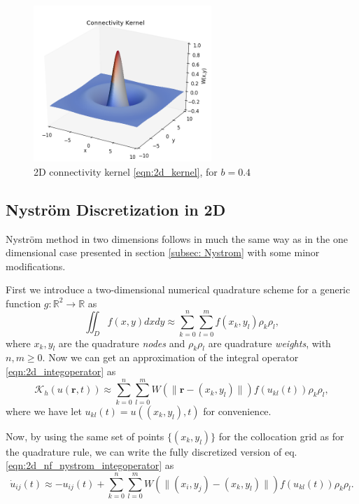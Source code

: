 \documentclass{uonmathreport}
\begin{document}
\begin{figure}
	\begin{center}
		\includegraphics[width=0.6\textwidth]{Figures/2d_kernel.png}
	\end{center}
	\caption{2D connectivity kernel \ref{eqn:2d_kernel}, for $b = 0.4$}
	\label{fig:2d_kernel}
\end{figure}

\subsection{Nystr\"om Discretization in 2D}\label{subsec:2d_nystrom}
Nystr\"om method in two dimensions follows in much the same way as in the one dimensional case presented in section \ref{subsec: Nystrom} with some minor modifications.

First we introduce a two-dimensional numerical quadrature scheme for a generic function $g: \mathbb{R}^2 \rightarrow \mathbb{R}$ as
\begin{equation}
	\iint_D f(x,y) dxdy \approx \sum_{k=0}^{n} \sum_{l=0}^{m} f(x_k, y_l)\rho_k\rho_l,
\end{equation}
where $x_k , y_l$ are the quadrature \textit{nodes} and $\rho_k\rho_l$ are quadrature \textit{weights}, with $n,m \geq 0$. Now we can get an approximation of the integral operator \ref{eqn:2d_integoperator} as
\begin{equation}
	\mathcal{K}_h(u(\mathbf{r},t)) \approx \sum_{k=0}^{n} \sum_{l=0}^{m} W(\| \mathbf{r} - (x_k, y_l) \|)f(u_{kl}(t))\rho_k \rho_l,
\end{equation} 
where we have let $u_{kl}(t) = u((x_k, y_l),t)$ for convenience.

Now, by using the same set of points $\{(x_k, y_l)\}$ for the collocation grid as for the quadrature rule, we can write the fully discretized version of eq.\ref{eqn:2d_nf_nystrom_integoperator} as
\begin{equation} \label{eqn:2d_fully_discrete}
\dot{u}_{ij}(t) \approx - u_{ij}(t) + \sum_{k=0}^{n} \sum_{l=0}^{m} W(\| (x_i, y_j) - (x_k, y_l) \|)f(u_{kl}(t))\rho_k \rho_l.
\end{equation}
\end{document}
